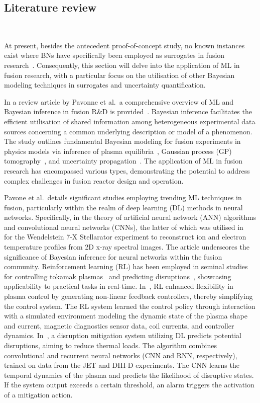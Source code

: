 \documentclass[journal]{IEEEtran}
\begin{document}
\subsection{Literature review}~\label{sec:background}

At present, besides the antecedent proof-of-concept study, no known instances exist where BNs have specifically been employed as surrogates in fusion research~\cite{Griffiths2024}. Consequently, this section will delve into the application of ML in fusion research, with a particular focus on the utilisation of other Bayesian modeling techniques in surrogates and uncertainty quantification.

In a review article by Pavonne et al.\ a comprehensive overview of ML and Bayesian inference in fusion R\&D is provided~\cite{Pavone2023}. Bayesian inference facilitates the efficient utilisation of shared information among heterogeneous experimental data sources concerning a common underlying description or model of a phenomenon. The study outlines fundamental Bayesian modeling for fusion experiments in physics models via inference of plasma equilibria~\cite{Svensson2003, Svensson2004}, Gaussian process (GP) tomography~\cite{Svensson2011}, and uncertainty propagation~\cite{Fischer2020, Fischer2010}. The application of ML in fusion research has encompassed various types, demonstrating the potential to address complex challenges in fusion reactor design and operation.

Pavone et al.~details significant studies employing trending ML techniques in fusion, particularly within the realm of deep learning (DL) methods in neural networks. Specifically, in the theory of artificial neural network (ANN) algorithms and convolutional neural networks (CNNs), the latter of which was utilised in~\cite{Pavone2019} for the Wendelstein 7-X Stellarator experiment to reconstruct ion and electron temperature profiles from 2D x-ray spectral images. The article underscores the significance of Bayesian inference for neural networks within the fusion community. Reinforcement learning (RL) has been employed in seminal studies for controlling tokamak plasmas~\cite{Degrave2022} and predicting disruptions~\cite{Kates2019}, showcasing applicability to practical tasks in real-time. In~\cite{Degrave2022}, RL enhanced flexibility in plasma control by generating non-linear feedback controllers, thereby simplifying the control system. The RL system learned the control policy through interaction with a simulated environment modeling the dynamic state of the plasma shape and current, magnetic diagnostics sensor data, coil currents, and controller dynamics. In~\cite{Kates2019}, a disruption mitigation system utilizing DL predicts potential disruptions, aiming to reduce thermal loads. The algorithm combines convolutional and recurrent neural networks (CNN and RNN, respectively), trained on data from the JET and DIII-D experiments. The CNN learns the temporal dynamics of the plasma and predicts the likelihood of disruptive states. If the system output exceeds a certain threshold, an alarm triggers the activation of a mitigation action. 
\end{document}
